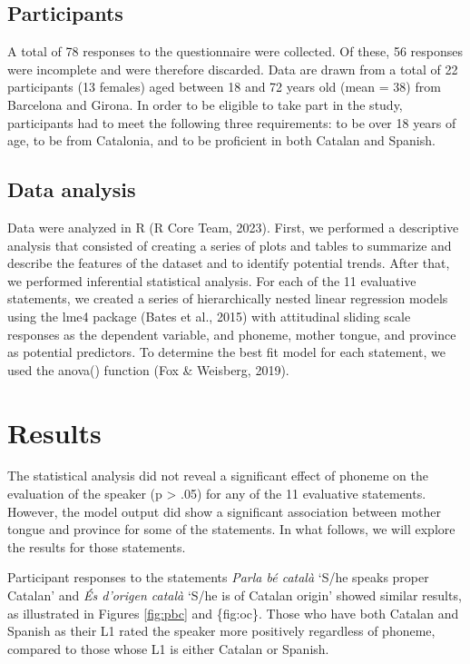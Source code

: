 \documentclass[
  a4paper,
  11pt,
  twocolumn]{article}
\begin{document}
\subsection{Participants}

A total of 78 responses to the questionnaire were collected. Of these,
56 responses were incomplete and were therefore discarded. Data are
drawn from a total of 22 participants (13 females) aged between 18 and
72 years old (mean = 38) from Barcelona and Girona. In order to be
eligible to take part in the study, participants had to meet the
following three requirements: to be over 18 years of age, to be from
Catalonia, and to be proficient in both Catalan and Spanish.

\subsection{Data analysis}

Data were analyzed in R (R Core Team, 2023). First, we performed a
descriptive analysis that consisted of creating a series of plots and
tables to summarize and describe the features of the dataset and to
identify potential trends. After that, we performed inferential
statistical analysis. For each of the 11 evaluative statements, we
created a series of hierarchically nested linear regression models using
the lme4 package (Bates et al., 2015) with attitudinal sliding scale
responses as the dependent variable, and phoneme, mother tongue, and
province as potential predictors. To determine the best fit model for
each statement, we used the anova() function (Fox \& Weisberg, 2019).

\section{Results}

The statistical analysis did not reveal a significant effect of phoneme
on the evaluation of the speaker (p \textgreater{} .05) for any of the
11 evaluative statements. However, the model output did show a
significant association between mother tongue and province for some of
the statements. In what follows, we will explore the results for those
statements.

Participant responses to the statements \emph{Parla bé català} `S/he
speaks proper Catalan' and \emph{És d'origen català} `S/he is of Catalan
origin' showed similar results, as illustrated in Figures \ref{fig:pbc}
and \{fig:oc\}. Those who have both Catalan and Spanish as their L1
rated the speaker more positively regardless of phoneme, compared to
those whose L1 is either Catalan or Spanish.
\end{document}
